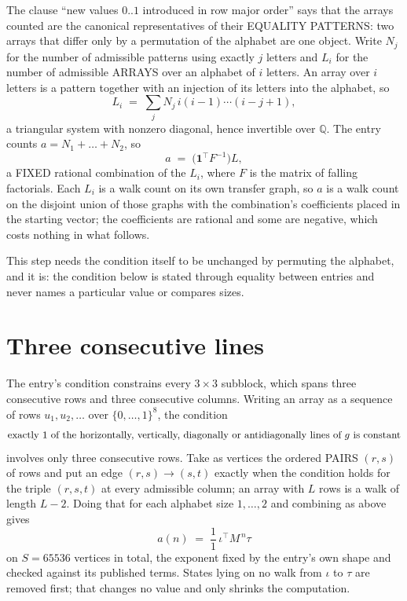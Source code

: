 \documentclass[11pt,a4paper]{article}
\theoremstyle{plain}
\theoremstyle{definition}
\begin{document}
The clause ``new values $0..1$ introduced in row major order'' says that the arrays
counted are the canonical representatives of their EQUALITY PATTERNS: two arrays that differ
only by a permutation of the alphabet are one object. Write $N_j$ for the number of admissible
patterns using exactly $j$ letters and $L_i$ for the number of admissible ARRAYS over an
alphabet of $i$ letters. An array over $i$ letters is a pattern together with an injection of
its letters into the alphabet, so
\[
L_i\;=\;\sum_{j}N_j\,i(i-1)\cdots(i-j+1),
\]
a triangular system with nonzero diagonal, hence invertible over $\mathbb{Q}$. The entry
counts $a=N_1+\dots+N_{2}$, so
\[
a\;=\;\bigl(\mathbf{1}^{\!\top}F^{-1}\bigr)L ,
\]
a FIXED rational combination of the $L_i$, where $F$ is the matrix of falling factorials.
Each $L_i$ is a walk count on its own transfer graph, so $a$ is a walk count on the disjoint
union of those graphs with the combination's coefficients placed in the starting vector; the
coefficients are rational and some are negative, which costs nothing in what follows.

This step needs the condition itself to be unchanged by permuting the alphabet, and it is:
the condition below is stated through equality between entries and never names a particular
value or compares sizes.

\section{Three consecutive lines}

The entry's condition constrains every $3\times3$ subblock, which spans three consecutive
rows and three consecutive columns. Writing an array as a sequence of rows
$u_1,u_2,\dots$ over $\{0,\dots,1\}^{8}$, the condition
\[
\text{exactly }1\text{ of the horizontally, vertically, diagonally or antidiagonally lines of }g\text{ \text{is constant}}
\]
involves only three consecutive rows. Take as vertices the ordered PAIRS $(r,s)$ of
rows and put an edge $(r,s)\to(s,t)$ exactly when the condition holds for the triple
$(r,s,t)$ at every admissible column; an array with $L$ rows is a walk of length $L-2$.
Doing that for each alphabet size $1,\dots,2$ and combining as above gives
\[
a(n)\;=\;\frac{1}{1}\,\iota^{\!\top}M^{\,n}\tau
\]
on $S=65536$ vertices in total, the exponent fixed by the entry's own shape and checked against
its published terms. States lying on no walk from $\iota$ to $\tau$ are removed first; that
changes no value and only shrinks the computation.
\end{document}

